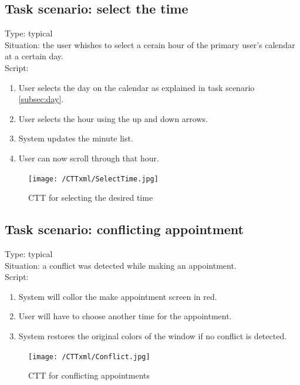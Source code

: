 \documentclass[11pt, a4paper,svglistings]{report}
\begin{document}

\subsection{Task scenario: select the time}

\label{subsec:hour}Type: typical \\
Situation: the user whishes to select a cerain hour  of the primary user's calendar at a certain day. \\
Script:
\begin{enumerate}
\item User selects the day on the calendar as explained in task scenario \ref{subsec:day}.
\item User selects the hour using the up and down arrows.
\item System updates the minute list.
\item User can now scroll through that hour.
\end{enumerate}

\begin{figure}[H]
\centering
    \texttt{[image: /CTTxml/SelectTime.jpg]}
  \caption[Select time CTT]{\label{fig:SelectTimeCTT}CTT for selecting the desired time}
\end{figure}


\subsection{Task scenario: conflicting appointment}


\label{subsec:conflict}Type: typical \\
Situation: a conflict was detected while making an appointment. \\
Script:
\begin{enumerate}
\item System will collor the make appointment screen in red.
\item User will have to choose another time for the appointment.
\item System restores the original colors of the window if no conflict is detected.
\end{enumerate}

\begin{figure}[H]
\centering
    \texttt{[image: /CTTxml/Conflict.jpg]}
  \caption[Conflict appointment CTT]{\label{fig:ConflictAppointment}CTT for conflicting appointments}
\end{figure}
\end{document}
